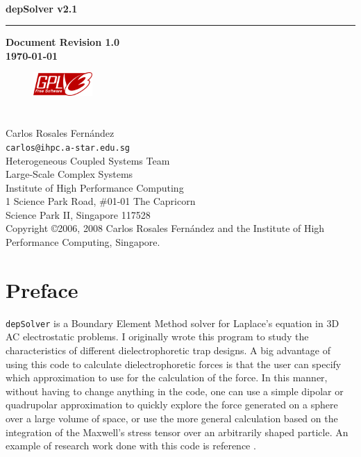 \documentclass[12pt]{report}
\begin{document}
\thispagestyle{empty}	%
\verb+ +
\vspace{4cm}
\begin{flushright}
\huge\bf depSolver v2.1\\
\rule{\textwidth}{4pt}
\large{\bf Document Revision 1.0\\
\today}
\end{flushright}

\newpage
\thispagestyle{empty}
\begin{flushleft}
\begin{figure}
\includegraphics[width=0.2\textwidth]{gplv3-127x51.png}
\end{figure}
\section*{}
\vspace{10cm}
Carlos Rosales Fern\'andez\\
\verb+carlos@ihpc.a-star.edu.sg+\\
\vspace{0.5em}
Heterogeneous Coupled Systems Team\\
Large-Scale Complex Systems\\
Institute of High Performance Computing\\
1 Science Park Road, \#01-01 The Capricorn\\
Science Park II, Singapore 117528\\
\vspace{1cm}
Copyright \copyright  2006, 2008 Carlos Rosales Fern\'andez and the Institute of High Performance Computing, Singapore.
\end{flushleft}
\newpage

\section*{Preface}\noindent \verb+depSolver+ is a Boundary Element Method solver for Laplace's equation in 3D AC electrostatic problems. I originally wrote this program to study the characteristics of different dielectrophoretic trap designs. A big advantage of using this code to calculate dielectrophoretic forces is that the user can specify which approximation to use for the calculation of the force. In this manner, without having to change anything in the code, one can use a simple dipolar or quadrupolar approximation to quickly explore the force generated on a sphere over a large volume of space, or use the more general calculation based on the integration of the Maxwell's stress tensor over an arbitrarily shaped particle. An example of research work done with this code is reference \cite{Rosales2005}.
\end{document}
